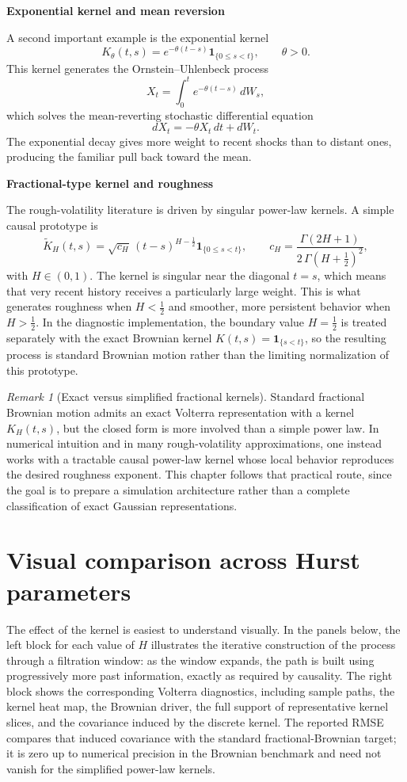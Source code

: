 \documentclass[a4paper,10pt,titlepage,oneside,openany]{book}
\theoremstyle{plain}
\theoremstyle{definition}
\theoremstyle{remark}
\newtheorem{remark}{Remark}[chapter]
\newcommand{\1}{\mathbf{1}}
\begin{document}
\textbf{Exponential kernel and mean reversion}

A second important example is the exponential kernel
\[
K_{\theta}(t,s)=e^{-\theta(t-s)}\mathbf{1}_{\{0\le s<t\}},
\qquad \theta>0.
\]
This kernel generates the Ornstein--Uhlenbeck process
\[
X_t=\int_0^t e^{-\theta(t-s)}\,dW_s,
\]
which solves the mean-reverting stochastic differential equation
\[
dX_t=-\theta X_t\,dt + dW_t.
\]
The exponential decay gives more weight to recent shocks than to distant ones, producing the familiar pull back toward the mean.

\textbf{Fractional-type kernel and roughness}

The rough-volatility literature is driven by singular power-law kernels. A simple causal prototype is
\[
\widetilde{K}_H(t,s)
=
\sqrt{c_H}\,(t-s)^{H-\frac12}\mathbf{1}_{\{0\le s<t\}},
\qquad
c_H=\frac{\Gamma(2H+1)}{2\,\Gamma(H+\frac12)^2},
\]
with \(H\in(0,1)\). The kernel is singular near the diagonal \(t=s\), which means that very recent history receives a particularly large weight. This is what generates roughness when \(H<\tfrac12\) and smoother, more persistent behavior when \(H>\tfrac12\). In the diagnostic implementation, the boundary value \(H=\tfrac12\) is treated separately with the exact Brownian kernel \(K(t,s)=\mathbf{1}_{\{s<t\}}\), so the resulting process is standard Brownian motion rather than the limiting normalization of this prototype.

\begin{remark}[Exact versus simplified fractional kernels]
Standard fractional Brownian motion admits an exact Volterra representation with a kernel \(K_H(t,s)\), but the closed form is more involved than a simple power law. In numerical intuition and in many rough-volatility approximations, one instead works with a tractable causal power-law kernel whose local behavior reproduces the desired roughness exponent. This chapter follows that practical route, since the goal is to prepare a simulation architecture rather than a complete classification of exact Gaussian representations.
\end{remark}

\section{Visual comparison across Hurst parameters}

The effect of the kernel is easiest to understand visually. In the panels below, the left block for each value of \(H\) illustrates the iterative construction of the process through a filtration window: as the window expands, the path is built using progressively more past information, exactly as required by causality. The right block shows the corresponding Volterra diagnostics, including sample paths, the kernel heat map, the Brownian driver, the full support of representative kernel slices, and the covariance induced by the discrete kernel. The reported RMSE compares that induced covariance with the standard fractional-Brownian target; it is zero up to numerical precision in the Brownian benchmark and need not vanish for the simplified power-law kernels.
\end{document}
